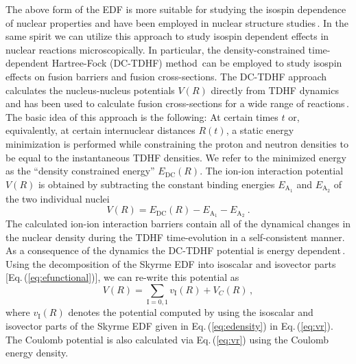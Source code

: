 The above form of the EDF is more suitable for studying the isospin dependence
of nuclear properties and have been employed in nuclear structure studies\,\citep{dobaczewski1995}.
In the same spirit we can utilize this approach to study isospin dependent effects in nuclear
reactions microscopically.
In particular, the density-constrained time-dependent Hartree-Fock (DC-TDHF) method\,\citep{umar2006b} can be
employed to study isospin effects on fusion barriers and fusion cross-sections.
The DC-TDHF approach calculates the nucleus-nucleus potentials $V(R)$ directly
from  TDHF dynamics and has been used to calculate fusion cross-sections for a wide range of
reactions\,\citep{umar2014a,simenel2013a,umar2012a,umar2006a,oberacker2010,umar2009a,jiang2015a}.
The basic idea of this approach is the following:
At certain times $t$ or, equivalently, at certain internuclear distances
$R(t)$, a static energy minimization
is performed while constraining the proton and neutron densities to be equal to the instantaneous
TDHF densities.
We refer to the minimized energy as the ``density constrained energy''
$E_{\mathrm{DC}}(R)$.
The ion-ion interaction potential $V(R)$ is obtained by
subtracting the constant binding energies
$E_{\mathrm{A_{1}}}$ and $E_{\mathrm{A_{2}}}$ of the two individual nuclei
\begin{equation}
V(R)=E_{\mathrm{DC}}(R)-E_{\mathrm{A_{1}}}-E_{\mathrm{A_{2}}}\ .
\label{eq:vr}
\end{equation}
The calculated ion-ion interaction barriers contain all of the dynamical changes in the nuclear
density during the TDHF time-evolution in a self-consistent manner.
As a consequence of the dynamics the DC-TDHF potential is energy dependent\,\citep{umar2014a}.
Using the decomposition of the Skyrme EDF into isoscalar and isovector parts [Eq.\,(\ref{eq:efunctional})],
we can re-write this potential as
\begin{equation}
V(R) = \sum_{\mathrm{I}=0,1} v_\mathrm{I}(R) + V_C(R)\,,
\end{equation}
where $v_\mathrm{I}(R)$ denotes the potential computed by using the isoscalar and isovector parts of
the Skyrme EDF given in Eq.\,(\ref{eq:edensity}) in Eq.\,(\ref{eq:vr}).
The Coulomb potential is also calculated via Eq.\,(\ref{eq:vr}) using the Coulomb energy
density.
